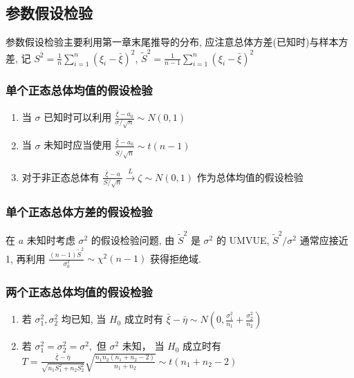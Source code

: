 \documentclass[10pt]{yerbaformat}
\begin{document}
\subsection{参数假设检验}

\par 参数假设检验主要利用第一章末尾推导的分布, 应注意总体方差(已知时)与样本方差, 记 $S^{2}=\frac{1}{n} \sum_{i=1}^{n}\left(\xi_{i}-\bar{\xi}\right)^{2}$, $\tilde{S}^{2}=\frac{1}{n-1} \sum_{i=1}^{n}\left(\xi_{i}-\bar{\xi}\right)^{2}$

\subsubsection{单个正态总体均值的假设检验}

\begin{enumerate}
    \item 当 $\sigma$ 已知时可以利用 $\frac{\bar{\xi}-a_{0}}{\sigma / \sqrt{n}} \sim N(0,1)$
    \item 当 $\sigma$ 未知时应当使用 $\frac{\bar{\xi}-a_{0}}{\tilde{S} / \sqrt{n}} \sim t(n-1)$
    \item 对于非正态总体有 $\frac{\bar{\xi}-a}{S / \sqrt{n}} \stackrel{L}{\rightarrow} \zeta \sim N(0,1)$ 作为总体均值的假设检验
\end{enumerate}


\subsubsection{单个正态总体方差的假设检验}

\par 在 $a$ 未知时考虑 $\sigma^{2}$ 的假设检验问题, 由 $\tilde{S}^{2}$ 是 $\sigma^{2}$ 的 UMVUE, $\tilde{S}^{2} / \sigma^{2}$ 通常应接近1, 再利用 $\frac{(n-1) \tilde{S}^{2}}{\sigma_{0}^{2}} \sim \chi^{2}(n-1)$ 获得拒绝域.

\subsubsection{两个正态总体均值的假设检验}

\begin{enumerate}
    \item 若 $\sigma_{1}^{2}, \sigma_{2}^{2}$ 均已知, 当 $H_{0}$ 成立时有 $\bar{\xi}-\bar{\eta} \sim N\left(0, \frac{\sigma_{1}^{2}}{n_{1}}+\frac{\sigma_{2}^{2}}{n_{2}}\right)$
    \item 若 $\sigma_{1}^{2}=\sigma_{2}^{2}=\sigma^{2},$ 但 $\sigma^{2}$ 未知， 当 $H_{0}$ 成立时有 $T=\frac{\bar{\xi}-\bar{\eta}}{\sqrt{n_{1} S_{1}^{2}+n_{2} S_{2}^{2}}} \sqrt{\frac{n_{1} n_{2}\left(n_{1}+n_{2}-2\right)}{n_{1}+n_{2}}} \sim t\left(n_{1}+n_{2}-2\right)$
\end{enumerate}
\end{document}
